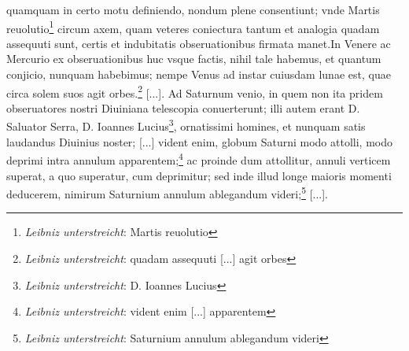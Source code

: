 \pend \pstart [p.~230] [...] quamquam in certo motu definiendo, nondum plene consentiunt; vnde Martis\protect{} reuolutio\footnote{\textit{Leibniz unterstreicht}: Martis reuolutio} circum axem, quam veteres coniectura tantum et analogia quadam assequuti sunt, certis et indubitatis obseruationibus firmata manet.\pend \pstart In Venere\protect{} ac Mercurio\protect{} ex obseruationibus huc vsque factis, nihil tale habemus, et quantum conjicio, nunquam habebimus; nempe Venus\protect{} ad instar cuiusdam lunae\protect{} est, quae circa solem suos agit orbes.\footnote{\textit{Leibniz unterstreicht}: quadam assequuti [...] agit orbes} [...]. \pend \pstart Ad Saturnum\protect{} venio, in quem non ita pridem obseruatores nostri Diuiniana telescopia\protect{} conuerterunt; illi autem erant D. Saluator Serra\protect{}, D. Ioannes Lucius\protect{}\footnote{\textit{Leibniz unterstreicht}: D. Ioannes Lucius\protect{}}, ornatissimi homines, et nunquam satis laudandus Diuinius\protect{} noster; [...] vident enim, globum Saturni\protect{} modo attolli, modo deprimi intra annulum apparentem;\footnote{\textit{Leibniz unterstreicht}: vident enim [...] apparentem} ac proinde dum attollitur, annuli verticem superat, a quo superatur, cum deprimitur; sed inde illud longe maioris momenti deducerem, nimirum Saturnium annulum ablegandum videri;\footnote{\textit{Leibniz unterstreicht}: Saturnium annulum ablegandum videri} [...].